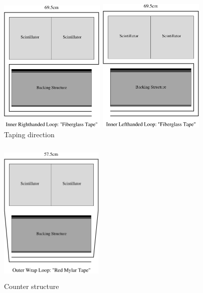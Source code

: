 \begin{figure}[h!]
\begin{minipage}[h]{0.5\linewidth}
\centering
\includegraphics[width=2.0in]{ye/fig_ye_construction/fig-tape4.pdf}
\end{minipage}%
\begin{minipage}[h]{0.5\linewidth}
\centering
\includegraphics[width=2.0in]{ye/fig_ye_construction/fig-tape3.pdf}
\end{minipage}
\caption{Taping direction}
\label{f:tape4}
\end{figure}

\begin{figure}[h!]
\centerline{\includegraphics[width=5cm,height=7cm]{ye/fig_ye_construction/fig-tape2.pdf}}
\caption{Counter structure}
\label{f:tape2}
\end{figure}


